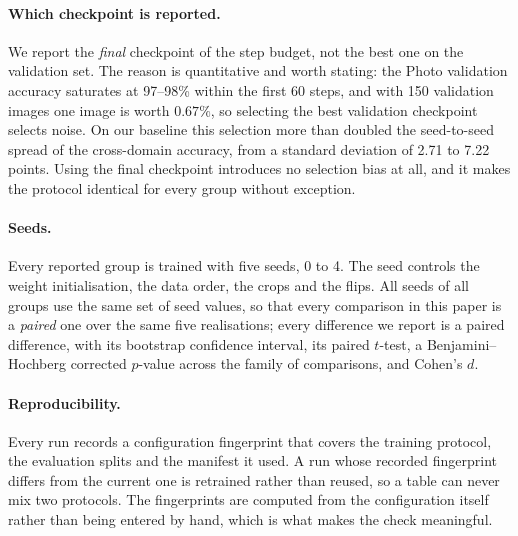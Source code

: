 \paragraph{Which checkpoint is reported.}
We report the \emph{final} checkpoint of the step budget, not the
best one on the validation set. The reason is quantitative and worth
stating: the Photo validation accuracy saturates at 97--98\% within the
first 60 steps, and with 150 validation images one image is worth
$0.67\%$, so selecting the best validation checkpoint selects noise. On our
baseline this selection more than doubled the seed-to-seed spread of the
cross-domain accuracy, from a standard deviation of 2.71 to 7.22 points.
Using the final checkpoint introduces no selection bias at all, and it makes
the protocol identical for every group without exception.

\paragraph{Seeds.}
Every reported group is trained with five seeds, 0 to 4. The seed controls
the weight initialisation, the data order, the crops and the flips. All
seeds of all groups use the same set of seed values, so that every
comparison in this paper is a \emph{paired} one over the same five
realisations; every difference we report is a paired difference, with its
bootstrap confidence interval, its paired $t$-test, a
Benjamini--Hochberg corrected $p$-value across the family of comparisons,
and Cohen's $d$.

\paragraph{Reproducibility.}
Every run records a configuration fingerprint that covers the training
protocol, the evaluation splits and the manifest it used. A run whose
recorded fingerprint differs from the current one is retrained rather than
reused, so a table can never mix two protocols. The fingerprints are
computed from the configuration itself rather than being entered by hand,
which is what makes the check meaningful.
